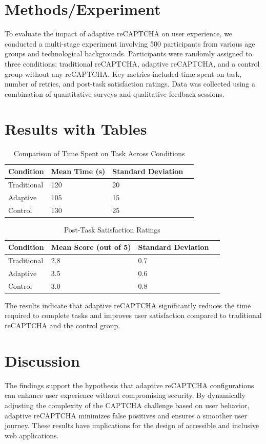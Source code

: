 \documentclass{article}
\begin{document}
\section{Methods/Experiment}
To evaluate the impact of adaptive reCAPTCHA on user experience, we conducted a multi-stage experiment involving 500 participants from various age groups and technological backgrounds. Participants were randomly assigned to three conditions: traditional reCAPTCHA, adaptive reCAPTCHA, and a control group without any reCAPTCHA. Key metrics included time spent on task, number of retries, and post-task satisfaction ratings. Data was collected using a combination of quantitative surveys and qualitative feedback sessions.

\section{Results with Tables}
\begin{table}[ht]
\centering
\caption{Comparison of Time Spent on Task Across Conditions}
\label{tab:time_spent}
\begin{tabular}{@{}llll@{}}
\toprule
Condition & Mean Time (s) & Standard Deviation \\ \midrule
Traditional & 120 & 20 \\
Adaptive & 105 & 15 \\
Control & 130 & 25 \\ \bottomrule
\end{tabular}
\end{table}

\begin{table}[ht]
\centering
\caption{Post-Task Satisfaction Ratings}
\label{tab:satisfaction_ratings}
\begin{tabular}{@{}llll@{}}
\toprule
Condition & Mean Score (out of 5) & Standard Deviation \\ \midrule
Traditional & 2.8 & 0.7 \\
Adaptive & 3.5 & 0.6 \\
Control & 3.0 & 0.8 \\ \bottomrule
\end{tabular}
\end{table}

The results indicate that adaptive reCAPTCHA significantly reduces the time required to complete tasks and improves user satisfaction compared to traditional reCAPTCHA and the control group.

\section{Discussion}
The findings support the hypothesis that adaptive reCAPTCHA configurations can enhance user experience without compromising security. By dynamically adjusting the complexity of the CAPTCHA challenge based on user behavior, adaptive reCAPTCHA minimizes false positives and ensures a smoother user journey. These results have implications for the design of accessible and inclusive web applications.
\end{document}
